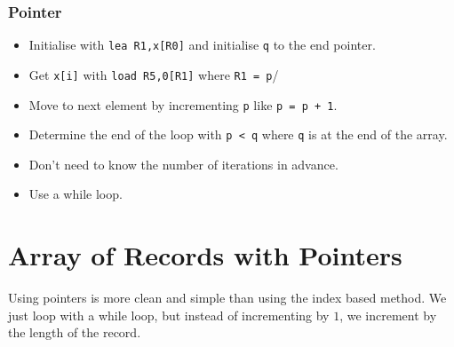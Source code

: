 \subsubsection{Pointer}\label{ssub:pointer}

\begin{itemize}
	\item Initialise with \texttt{lea R1,x[R0]} and initialise \texttt{q} to the end pointer.
	\item Get \texttt{x[i]} with \texttt{load R5,0[R1]} where \texttt{R1 = p}/
	\item Move to next element by incrementing \texttt{p} like \texttt{p = p + 1}.
	\item Determine the end of the loop with \texttt{p < q} where \texttt{q} is at the end of the array.
	\item Don't need to know the number of iterations in advance.
	\item Use a while loop.
\end{itemize}

\section{Array of Records with Pointers}\label{sec:array_of_records_with_pointers}

Using pointers is more clean and simple than using the index based method.
We just loop with a while loop, but instead of incrementing by \(1\), we increment by the length of the record.
